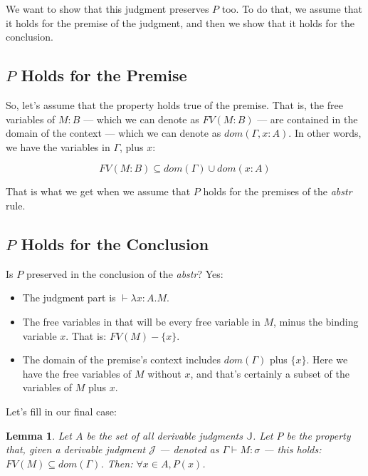 \documentclass{book}
\numberwithin{equation}{chapter}
\newtheorem*{anon-lemma}{Lemma}
\begin{document}
\noindent
We want to show that this judgment preserves $P$ too. To do that, we assume that it holds for the premise of the judgment, and then we show that it holds for the conclusion. 


\subsection{$P$ Holds for the Premise}

So, let's assume that the property holds true of the premise. That is, the free variables of $M : B$ --- which we can denote as $FV(M : B)$ --- are contained in the domain of the context --- which we can denote as $dom(\Gamma, x : A)$. In other words, we have the variables in $\Gamma$, plus $x$:

\begin{equation*}
FV(M : B) \subseteq dom(\Gamma) \cup dom(x : A)
\end{equation*}

\noindent
That is what we get when we assume that $P$ holds for the premises of the \textit{abstr} rule.

\subsection{$P$ Holds for the Conclusion}

Is $P$ preserved in the conclusion of the \textit{abstr}? Yes:

\begin{itemize}
\item{The judgment part is $\vdash \lambda x : A.M$.}
\item{The free variables in that will be every free variable in $M$, minus the binding variable $x$. That is: $FV(M) - \{x\}$.}
\item{The domain of the premise's context includes $dom(\Gamma)$ plus $\{ x \}$. Here we have the free variables of $M$ without $x$, and that's certainly a subset of the variables of $M$ plus $x$.}
\end{itemize}

\noindent
Let's fill in our final case:

\noindent
\hrulefill

\begin{anon-lemma}
Let $A$ be the set of all derivable judgments $\mathbb{J}$. Let $P$ be the property that, given a derivable judgment $\mathcal{J}$ --- denoted as $\Gamma \vdash M : \sigma$ --- this holds: $FV(M) \subseteq dom(\Gamma)$. Then: $\forall x \in A, P(x)$.
\end{anon-lemma}
\end{document}
